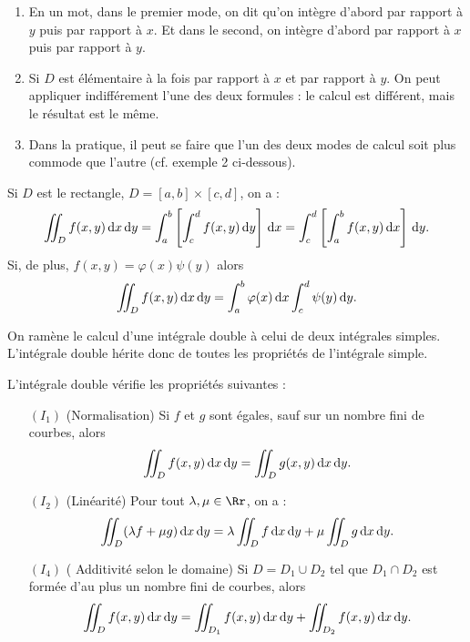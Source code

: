 \documentclass[class=report,crop=false]{standalone}
\begin{document}
\vskip6mm

\begin{enumerate}
\item En un mot, dans le premier mode, on dit qu'on intègre d'abord par rapport à $y$ puis par rapport à $x$. Et dans le second, on intègre d'abord par rapport à $x$ puis par rapport à $y$.
\item Si $D$ est élémentaire à la fois par rapport à $x$ et par rapport à $y$. On peut appliquer indifférement l'une des deux formules : le calcul est différent, mais le résultat est le m\^eme.
\item Dans la pratique, il peut se faire que l'un des deux modes de calcul soit plus commode que l'autre (cf. exemple 2 ci-dessous).
\end{enumerate}

\vskip6mm

\begin{corollaire}Si $D$ est le rectangle, $D=[a,b]\times [c,d]$, on a :
$$\int \!\!\!\!\int _Df(x,y)\,\mathrm{d} x\,\mathrm{d} y =\int_a^b\left[\int _{c}^{d}f(x,y)\,\mathrm{d} y\right]\,\mathrm{d} x=\int_c^d\left[\int _{a}^{b}f(x,y)\,\mathrm{d} x\right]\,\mathrm{d} y.$$
Si, de plus, $f(x,y)=\varphi (x)\psi (y)$ alors
$$\int \!\!\!\!\int _Df(x,y)\,\mathrm{d} x\,\mathrm{d} y =\int_a^b\varphi (x)\,\mathrm{d} x\int _{c}^{d}\psi (y)\,\mathrm{d} y.$$
\end{corollaire}

\vskip6mm

\noindent On ramène le calcul d'une intégrale double à celui de deux intégrales simples. L'intégrale double hérite donc de toutes les propriétés de l'intégrale simple.

\vskip6mm

\begin{proposition}[\bf Propriétés]L'intégrale double vérifie les propriétés suivantes :
\begin{enumerate}
\item[$(I_1)$] (Normalisation) Si $f$ et $g$ sont égales, sauf sur un nombre fini de courbes, alors 
$$\displaystyle \int \!\!\!\!\int _{D}f(x,y)\d x\d y=\int \!\!\!\!\int _{D}g(x,y)\d x\d y.$$
\item[$(I_2)$] (Linéarité) Pour tout $\lambda ,\mu \in \Rr$, on a :
$$\int \!\!\!\!\int _{D}(\lambda f+\mu g)\d x\d y=\lambda \int \!\!\!\!\int _{D}f\d x\d y+\mu \int \!\!\!\!\int _{D}g\d x\d y.$$
\item[$(I_4)$] ( Additivité selon le domaine) Si $D=D_1\cup D_2$ tel que $D_1\cap D_2$ est formée d'au plus un nombre fini de courbes, alors
$$\int \!\!\!\!\int _{D}f(x,y)\d x\d y=\int \!\!\!\!\int _{D_1}f(x,y)\d x\d y+\int \!\!\!\!\int _{D_2}f(x,y)\d x\d y.$$
\end{enumerate}
\end{proposition}
\end{document}

